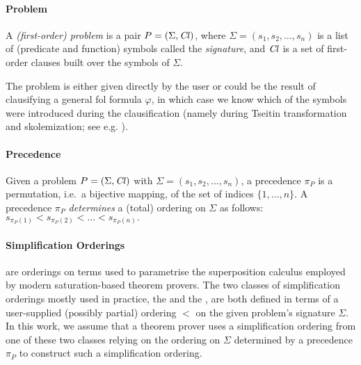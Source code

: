 
\paragraph{Problem}
A \emph{(first-order) problem} is a pair \(P = (\Sigma, \operatorname{\mathit{Cl}})\),
where \(\Sigma = (s_1, s_2, \ldots, s_n)\) is a list of (predicate and function) symbols called the \emph{signature},
and \(\operatorname{\mathit{Cl}}\) is a set of first-order %
clauses built over the symbols of \(\Sigma\).

The problem is either given directly by the user or 
could be the result of clausifying a general \gls{fol} formula \(\varphi\),
in which case we know which of the symbols were introduced during the clausification
(namely during Tseitin transformation and skolemization; see e.g. \cite{DBLP:books/el/RV01/NonnengartW01}).

\paragraph{Precedence}
Given a problem \(P = (\Sigma, \operatorname{\mathit{Cl}})\) with \(\Sigma = (s_1, s_2, \ldots, s_n)\),
a precedence \(\pi_P\) is a permutation, i.e.~a bijective mapping, of the set of indices \(\{1,\ldots,n\}\).
A precedence \(\pi_P\) \emph{determines} a (total) ordering on \(\Sigma\) as follows:
\(s_{\pi_P(1)} < s_{\pi_P(2)} < \ldots < s_{\pi_P(n)}.\)

\paragraph{Simplification Orderings} are orderings on terms used to parametrise the superposition calculus \cite{Nieuwenhuis2001}
employed by modern saturation-based theorem provers. The two classes of simplification orderings mostly used in practice,
the  \cite{Knuth1983} and the  \cite{Kamin1980}, are both defined in terms 
of a user-supplied (possibly partial) ordering $<$ %
on the given problem's signature \(\Sigma\).
In this work, we assume that a theorem prover uses a simplification ordering from one of these two classes
relying on the ordering on \(\Sigma\) determined by a precedence \(\pi_P\) to construct such a simplification ordering.


